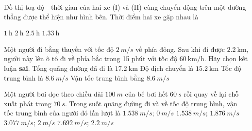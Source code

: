 \begin{ex}
	Đồ thị toạ độ - thời gian của hai xe (I) và (II) cùng chuyển động trên một đường thẳng được thể hiện như hình bên. Thời điểm hai xe gặp nhau là
	\begin{center}
	\end{center}
	\choice
	{$\SI{1}{\hour}$}
	{\True$\SI{2}{\hour}$}
	{$\SI{2.5}{\hour}$}
	{$\SI{1.33}{\hour}$}
	\loigiai{}
\end{ex}

\begin{ex}
Một người đi bằng thuyền với tốc độ $\SI{2}{m/s}$ về phía đông. Sau khi đi được $\SI{2.2}{\kilo\meter}$, người này lên ô tô đi về phía bắc trong 15 phút với tốc độ $\SI{60}{\kilo\meter/\hour}$. Hãy chọn kết luận \textbf{sai}.
		\choice
		{Tổng quãng đường đã đi là $\SI{17.2}{\kilo\meter}$}
		{Độ dịch chuyển là $\SI{15.2}{\kilo\meter}$}
		{Tốc độ trung bình là $\SI{8.6}{m/s}$}
		{\True Vận tốc trung bình bằng $\SI{8.6}{m/s}$}
	\loigiai{}
\end{ex}

\begin{ex}
Một người bơi dọc theo chiều dài $\SI{100}{m}$ của bể bơi hết $\SI{60}{s}$ rồi quay về lại chỗ xuất phát trong $\SI{70}{s}$. Trong suốt quãng đường đi và về tốc độ trung bình, vận tốc trung bình của người đó lần lượt là
		\choice
		{\True $\SI{1.538}{m/s}$; $\SI{0}{m/s}$}
		{$\SI{1.538}{m/s}$; $\SI{1.876}{m/s}$}
		{$\SI{3.077}{m/s}$; $\SI{2}{m/s}$}
		{$\SI{7.692}{m/s}$; $\SI{2.2}{m/s}$}
	\loigiai{}
\end{ex}

